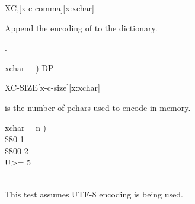 \begin{worddef*}{}{XC,}[x-c-comma][x:xchar]
\item {}

	Append the encoding of  to the dictionary.

\see {}.

	\begin{implement}
	\word{:}   xchar -{}- )   DP \word{!} \word{;}
	\end{implement}
\end{worddef*}


\begin{worddef*}{}{XC-SIZE}[x-c-size][x:xchar]
\item {}

	 is the number of pchars used to encode  in memory.

	\begin{implement}
	\word{:}   xchar -{}- n ) \\
	\tab {} \$80    1     \\
	\tab \$800  2  \\
	\tab {}  U>=   5         \\
	\tab {}  \\
	\word{;}
	\end{implement}

	\begin{testing}
		This test assumes UTF-8 encoding is being used.

		\ttfamily
		 \\
		 \\
		 \\
		 \\
		 \\
		 \\
		 \\
		 \\
  \end{testing}
\end{worddef*}


